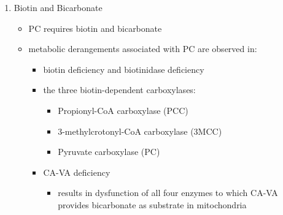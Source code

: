 \documentclass{scrartcl}
\begin{document}
\begin{enumerate}
\item Biotin and Bicarbonate
\label{sec:org8b9d64b}
\begin{itemize}
\item PC requires biotin and bicarbonate
\item metabolic derangements associated with PC are observed in:
\begin{itemize}
\item biotin deficiency and biotinidase deficiency
\item the three biotin-dependent carboxylases:
\begin{itemize}
\item Propionyl-CoA carboxylase (PCC)
\item 3-methylcrotonyl-CoA carboxylase (3MCC)
\item Pyruvate carboxylase (PC)
\end{itemize}

\item CA-VA deficiency
\begin{itemize}
\item results in dysfunction of all four enzymes to which CA-VA
provides bicarbonate as substrate in mitochondria
\end{itemize}
\end{itemize}
\end{itemize}


\end{enumerate}
\end{document}
